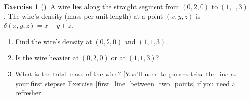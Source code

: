 \documentclass[10pt,]{book}
\theoremstyle{plain}
\theoremstyle{definition}
\theoremstyle{definition}
\theoremstyle{definition}
\theoremstyle{definition}
\newtheorem{exploration}[project]{Exercise}
\theoremstyle{definition}
\numberwithin{equation}{section}
\begin{document}
\begin{exploration}[]\label{exploration-217}
A wire lies along the straight segment from \((0,2,0)\) to \((1,1,3)\). The wire's density (mass per unit length) at a point \((x,y,z)\) is \(\delta(x,y,z)=x+y+z\).%
\begin{enumerate}[font=\bfseries,label=(\alph*),ref=\alph*]
\item\label{task-566} Find the wire's density at \((0,2,0)\) and \((1,1,3)\).%
\item\label{task-567} Is the wire heavier at \((0,2,0)\) or at \((1,1,3)\)?%
\item\label{task-568} What is the total mass of the wire?  [You'll need to parametrize the line as your first step\textemdash{}see \hyperref[first_line_between_two_points]{Exercise~\ref{first_line_between_two_points}} if you need a refresher.]%
\end{enumerate}
\end{exploration}
\typeout{************************************************}
\typeout{************************************************}
\end{document}
